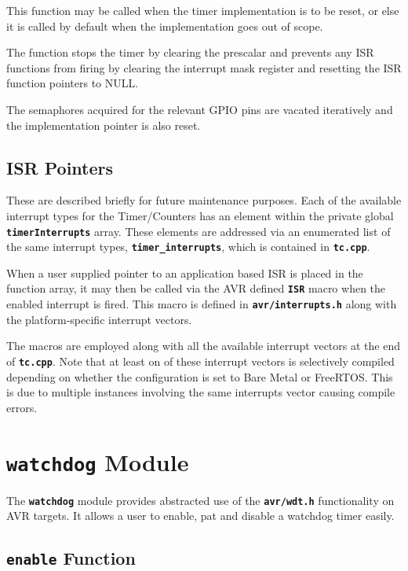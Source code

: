 \documentclass[a4paper, oneside, 11pt, titlepage, onecolumn, openright]{report}
\begin{document}
			This function may be called when the timer implementation is to be reset, or else it is called by default when the implementation goes out of scope.
			
			The function stops the timer by clearing the prescalar and prevents any ISR functions from firing by clearing the interrupt mask register and resetting the ISR function pointers to NULL.
			
			The semaphores acquired for the relevant GPIO pins are vacated iteratively and the implementation pointer is also reset.
			
\subsection{ISR Pointers}
			\label{ss:HALtcISRPointers}
			
			These are described briefly for future maintenance purposes. Each of the available interrupt types for the Timer/Counters has an element within the private global \textbf{\texttt{timerInterrupts}} array. These elements are addressed via an enumerated list of the same interrupt types, \textbf{\texttt{timer\_interrupts}}, which is contained in \textbf{\texttt{tc.cpp}}.
			
			When a user supplied pointer to an application based ISR is placed in the function array, it may then be called via the AVR defined \textbf{\texttt{ISR}} macro when the enabled interrupt is fired. This macro is defined in \textbf{\texttt{avr/interrupts.h}} along with the platform-specific interrupt vectors.
			
			The macros are employed along with all the available interrupt vectors at the end of \textbf{\texttt{tc.cpp}}. Note that at least on of these interrupt vectors is selectively compiled depending on whether the configuration is set to Bare Metal or FreeRTOS. This is due to multiple instances involving the same interrupts vector causing compile errors.
			
\section{\textbf{\texttt{watchdog}} Module}
			\label{s:HALwatchdogModule}
			
			The \textbf{\texttt{watchdog}} module provides abstracted use of the \textbf{\texttt{avr/wdt.h}} functionality on AVR targets. It allows a user to enable, pat and disable a watchdog timer easily.

\subsection{\textbf{\texttt{enable}} Function}
			\label{ss:HALwatchdogenableFunction}
			
\end{document}
